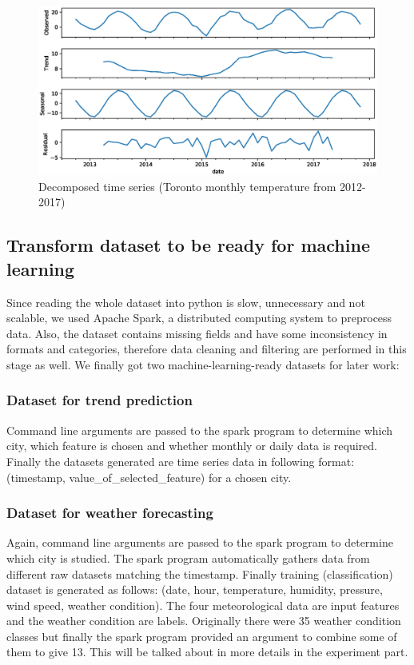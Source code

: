 \documentclass[runningheads]{llncs}
\begin{document}
\begin{figure}
    \includegraphics[width=\textwidth]{Toronto-decomposition.eps}
    \caption{Decomposed time series (Toronto monthly temperature from 2012-2017)}\label{toronto-decomp}
\end{figure}

\subsection{Transform dataset to be ready for machine learning}
Since reading the whole dataset into python is slow, unnecessary and not scalable, we used Apache Spark, a distributed computing system to preprocess data. Also, the dataset contains missing fields and have some inconsistency in formats and categories, therefore data cleaning and filtering are performed in this stage as well. We finally got two machine-learning-ready datasets for later work:

\subsubsection{Dataset for trend prediction}
Command line arguments are passed to the spark program to determine which city, which feature is chosen and whether monthly or daily data is required. Finally the datasets generated are time series data in following format:
(timestamp, value\_of\_selected\_feature) for a chosen city.

\subsubsection{Dataset for weather forecasting}
Again, command line arguments are passed to the spark program to determine which city is studied. The spark program automatically gathers data from different raw datasets matching the timestamp. Finally training (classification) dataset is generated as follows: (date, hour, temperature, humidity, pressure, wind speed, weather condition). The four meteorological data are input features and the weather condition are labels. Originally there were 35 weather condition classes but finally the spark program provided an argument to combine some of them to give 13. This will be talked about in more details in the experiment part.
\end{document}
